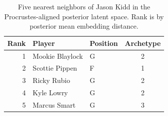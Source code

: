 \begin{table}[htbp]
  \centering\small
  \begin{tabular}{rllc}
    \toprule
    Rank & Player & Position & Archetype \\
    \midrule
    1 & Mookie Blaylock & G & 2 \\
    2 & Scottie Pippen & F & 1 \\
    3 & Ricky Rubio & G & 2 \\
    4 & Kyle Lowry & G & 2 \\
    5 & Marcus Smart & G & 3 \\
    \bottomrule
  \end{tabular}
  \caption{Five nearest neighbors of Jason Kidd in the Procrustes-aligned posterior latent space. Rank is by posterior mean embedding distance.}
  \label{tab:Jason_Kidd_neighbors}
\end{table}

